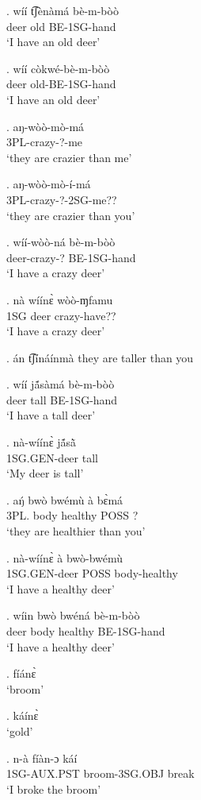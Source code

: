 \documentclass{assets/fieldnotes}
\begin{document}
\exg. wíí t͡ʃènàmá bè-m-bòò\\
deer old BE-1SG-hand\\
`I have an old deer'

\exg. wíí còkwé-bè-m-bòò\\
deer old-BE-1SG-hand\\
`I have an old deer'


\exg. aŋ-wòò-mò-má\\
3PL-crazy-?-me\\
`they are crazier than me'

\exg. aŋ-wòò-mò-í-má\\
3PL-crazy-?-2SG-me??\\
`they are crazier than you'


\exg. wíí-wòò-ná bè-m-bòò\\
deer-crazy-? BE-1SG-hand\\
`I have a crazy deer'

\exg. nà wíínɛ̀ wòò-ɱfamu\\
1SG deer crazy-have??\\
`I have a crazy deer'

\ex. án t͡ʃínáínmà
they are taller than you 

\exg. wíí jã́sàmá bè-m-bòò\\
deer tall BE-1SG-hand\\
`I have a tall deer'

\exg. nà-wíínɛ̀ jã́sã̀\\
1SG.GEN-deer tall\\
`My deer is tall'

\exg. aŋ́ bwò bwémù à bɛ̀má\\
3PL. body healthy POSS ?\\
`they are healthier than you'

\exg. nà-wíínɛ̀ à bwò-bwémù\\
1SG.GEN-deer POSS body-healthy\\
`I have a healthy deer'

\exg. wíin bwò bwéná bè-m-bòò\\
deer body healthy BE-1SG-hand\\
`I have a healthy deer'


\ex. fíánɛ̀\\
`broom'

\ex. káínɛ̀\\
`gold'

\exg. n-à fíàn-ɔ káí\\
1SG-AUX.PST broom-3SG.OBJ break\\
`I broke the broom'
\end{document}
